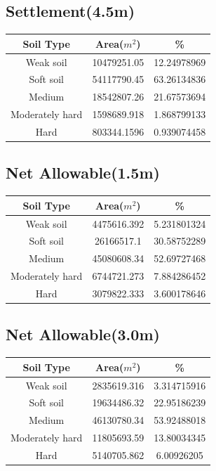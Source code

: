 \begin{center}
\subsection{Settlement(4.5m)}
\begin{tabular}{|c | c | c|} 
\hline
Soil Type & Area($m^2$) & \% \\
\hline
Weak soil & 10479251.05 & 12.24978969 \\
Soft soil & 54117790.45 & 63.26134836 \\
Medium & 18542807.26 & 21.67573694 \\
Moderately hard & 1598689.918 & 1.868799133 \\
Hard & 803344.1596 & 0.939074458 \\
\hline
\end{tabular}
\pagebreak

\subsection{Net Allowable(1.5m)}
\begin{tabular}{|c | c | c|} 
\hline
Soil Type & Area($m^2$) & \% \\
\hline
Weak soil & 4475616.392 & 5.231801324\\
Soft soil & 26166517.1 & 30.58752289\\
Medium & 45080608.34 & 52.69727468\\
Moderately hard & 6744721.273 & 7.884286452\\
Hard & 3079822.333 & 3.600178646\\
\hline
\end{tabular}

\subsection{Net Allowable(3.0m)}
\begin{tabular}{|c | c | c|} 
\hline
Soil Type & Area($m^2$) & \% \\
\hline
Weak soil & 2835619.316 & 3.314715916\\
Soft soil & 19634486.32 & 22.95186239\\
Medium & 46130780.34 & 53.92488018\\
Moderately hard & 11805693.59 & 13.80034345\\
Hard & 5140705.862 & 6.00926205\\
\hline
\end{tabular}


\end{center}

